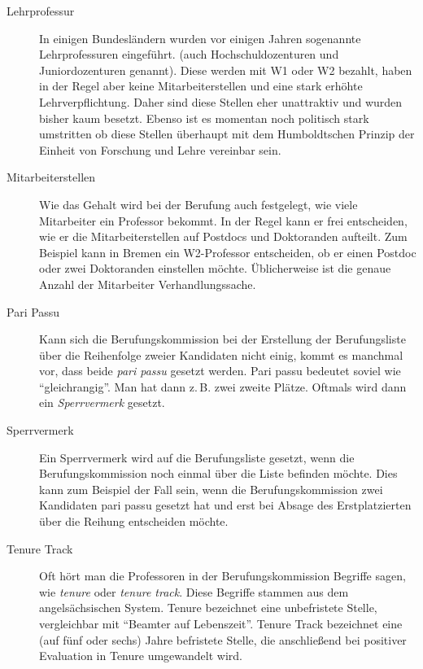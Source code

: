 \documentclass[10pt,twoside,a5paper,openright]{book}
\begin{document}
\begin{description}
	\item [Lehrprofessur]
			In einigen Bundesländern wurden vor einigen Jahren sogenannte Lehrprofessuren eingeführt.
			(auch Hochschuldozenturen und Juniordozenturen genannt). Diese werden mit W1 oder W2 bezahlt, haben
			in der Regel aber keine Mitarbeiterstellen und eine stark er\-höh\-te Lehrverpflichtung. Daher
			sind diese Stellen eher unattraktiv und wurden bisher kaum besetzt. Ebenso ist es momentan noch
			politisch stark umstritten ob diese Stellen überhaupt mit dem Humboldtschen Prinzip der Einheit
			von Forschung und Lehre vereinbar sein. 
			
	\item [Mitarbeiterstellen]
			Wie das Gehalt wird bei der Berufung auch festgelegt, wie viele Mitarbeiter ein Professor bekommt.
			In der Regel kann er frei entscheiden, wie er die Mitarbeiterstellen auf Postdocs und Doktoranden
			aufteilt. Zum Beispiel kann in Bremen ein W2-Professor entscheiden, ob er einen Postdoc oder zwei
			Doktoranden einstellen möchte. Üblicherweise ist die genaue Anzahl der Mitarbeiter 
			Verhandlungssache.
			
	\item [Pari Passu]
			Kann sich die Berufungskommission bei der Erstellung der Berufungsliste über die Reihenfolge zweier
			Kandidaten nicht einig, kommt es manchmal vor, dass beide \emph{pari passu} gesetzt werden. Pari passu
			bedeutet soviel wie "`gleichrangig"'. Man hat dann z.\,B. zwei zweite Plätze. Oftmals wird dann ein
			\emph{Sperrvermerk} gesetzt.
			
	\item [Sperrvermerk]
			Ein Sperrvermerk wird auf die Berufungsliste gesetzt, wenn die Berufungskommission noch einmal
			über die Liste befinden möchte. Dies kann zum Beispiel der Fall sein, wenn die Berufungskommission zwei Kandidaten
			pari passu gesetzt hat und erst bei Absage des Erstplatzierten über die Reihung entscheiden
			möchte.

	\item [Tenure Track]
	 		Oft hört man die Professoren in der Berufungskommission Begriffe sagen, wie \emph{tenure} oder \emph{tenure track}.
	 		Diese Begriffe stammen aus dem angelsächsischen System. Tenure bezeichnet eine unbefristete Stelle,
	 		vergleichbar mit "`Beamter auf Lebenszeit"'. Tenure Track bezeichnet eine (auf fünf oder sechs) Jahre
	 		befristete Stelle, die anschließend bei positiver Evaluation in Tenure umgewandelt wird.
\end{description}
\end{document}
